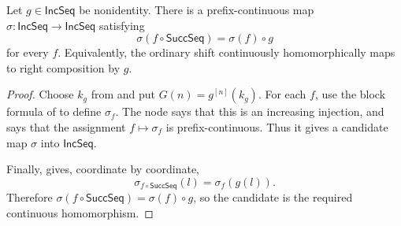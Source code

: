 \begin{lemma}
Let $g\in\mathsf{IncSeq}$ be nonidentity.  There is a prefix-continuous map
$\sigma:\mathsf{IncSeq}\to\mathsf{IncSeq}$ satisfying
\[
\sigma(f\circ\mathsf{SuccSeq})=\sigma(f)\circ g
\]
for every $f$.  Equivalently, the ordinary shift continuously
homomorphically maps to right composition by $g$.
\end{lemma}
\begin{proof}
Choose $k_g$ from  and put
$G(n)=g^{[n]}(k_g)$.  For each $f$, use the block formula of
 to define $\sigma_f$.  The node
 says that this is an increasing injection,
and  says that the assignment
$f\mapsto\sigma_f$ is prefix-continuous.  Thus it gives a candidate map
$\sigma$ into $\mathsf{IncSeq}$.

Finally,  gives, coordinate by coordinate,
\[
\sigma_{f\circ\mathsf{SuccSeq}}(l)=\sigma_f(g(l)).
\]
Therefore $\sigma(f\circ\mathsf{SuccSeq})=\sigma(f)\circ g$, so the
candidate is the required continuous homomorphism.
\end{proof}

